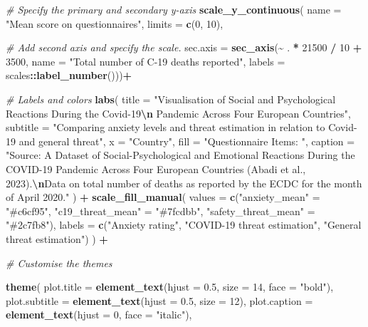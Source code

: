 \documentclass[
]{article}
\newenvironment{Shaded}{\begin{snugshade}}{\end{snugshade}}
\newcommand{\AttributeTok}[1]{\textcolor[rgb]{0.13,0.29,0.53}{#1}}
\newcommand{\CommentTok}[1]{\textcolor[rgb]{0.56,0.35,0.01}{\textit{#1}}}
\newcommand{\DecValTok}[1]{\textcolor[rgb]{0.00,0.00,0.81}{#1}}
\newcommand{\FloatTok}[1]{\textcolor[rgb]{0.00,0.00,0.81}{#1}}
\newcommand{\FunctionTok}[1]{\textcolor[rgb]{0.13,0.29,0.53}{\textbf{#1}}}
\newcommand{\NormalTok}[1]{#1}
\newcommand{\OtherTok}[1]{\textcolor[rgb]{0.56,0.35,0.01}{#1}}
\newcommand{\SpecialCharTok}[1]{\textcolor[rgb]{0.81,0.36,0.00}{\textbf{#1}}}
\newcommand{\StringTok}[1]{\textcolor[rgb]{0.31,0.60,0.02}{#1}}
\begin{document}
\begin{Shaded}
\begin{Highlighting}[]
  \CommentTok{\# Specify the primary and secondary y{-}axis}
    \FunctionTok{scale\_y\_continuous}\NormalTok{(}
    \AttributeTok{name =} \StringTok{"Mean score on questionnaires"}\NormalTok{,}
    \AttributeTok{limits =} \FunctionTok{c}\NormalTok{(}\DecValTok{0}\NormalTok{, }\DecValTok{10}\NormalTok{),}
    
  \CommentTok{\# Add second axis and specify the scale. }
    \AttributeTok{sec.axis =} \FunctionTok{sec\_axis}\NormalTok{(}\SpecialCharTok{\textasciitilde{}}\NormalTok{ . }\SpecialCharTok{*} \DecValTok{21500} \SpecialCharTok{/} \DecValTok{10} \SpecialCharTok{+} \DecValTok{3500}\NormalTok{, }
      \AttributeTok{name =} \StringTok{"Total number of C{-}19 deaths reported"}\NormalTok{,}
      \AttributeTok{labels =}\NormalTok{ scales}\SpecialCharTok{::}\FunctionTok{label\_number}\NormalTok{()))}\SpecialCharTok{+}
  
  \CommentTok{\# Labels and colors}
  \FunctionTok{labs}\NormalTok{(}
    \AttributeTok{title =} \StringTok{"Visualisation of Social and Psychological Reactions During the Covid{-}19}\SpecialCharTok{\textbackslash{}n}\StringTok{ Pandemic Across Four European Countries"}\NormalTok{,}
    \AttributeTok{subtitle =} \StringTok{"Comparing anxiety levels and threat estimation in relation to Covid{-}19 and general threat"}\NormalTok{,}
    \AttributeTok{x =} \StringTok{"Country"}\NormalTok{,}
    \AttributeTok{fill =} \StringTok{"Questionnaire Items:  "}\NormalTok{,}
    \AttributeTok{caption =} \StringTok{"Source: A Dataset of Social{-}Psychological and Emotional Reactions During the COVID{-}19 Pandemic Across Four European Countries (Abadi et al., 2023).}\SpecialCharTok{\textbackslash{}n}\StringTok{Data on total number of deaths as reported by the ECDC for the month of April 2020."}
\NormalTok{  ) }\SpecialCharTok{+}
  \FunctionTok{scale\_fill\_manual}\NormalTok{(}
    \AttributeTok{values =} \FunctionTok{c}\NormalTok{(}\StringTok{"anxiety\_mean"} \OtherTok{=} \StringTok{"\#c6cf95"}\NormalTok{, }\StringTok{"c19\_threat\_mean"} \OtherTok{=} \StringTok{"\#7fcdbb"}\NormalTok{, }\StringTok{"safety\_threat\_mean"} \OtherTok{=} \StringTok{"\#2c7fb8"}\NormalTok{),}
    \AttributeTok{labels =} \FunctionTok{c}\NormalTok{(}\StringTok{"Anxiety rating"}\NormalTok{, }\StringTok{"COVID{-}19 threat estimation"}\NormalTok{, }\StringTok{"General threat estimation"}\NormalTok{)}
\NormalTok{  ) }\SpecialCharTok{+}
  
  \CommentTok{\# Customise the themes}
  
  \FunctionTok{theme}\NormalTok{(}
    \AttributeTok{plot.title =} \FunctionTok{element\_text}\NormalTok{(}\AttributeTok{hjust =} \FloatTok{0.5}\NormalTok{, }\AttributeTok{size =} \DecValTok{14}\NormalTok{, }\AttributeTok{face =} \StringTok{"bold"}\NormalTok{),}
    \AttributeTok{plot.subtitle =} \FunctionTok{element\_text}\NormalTok{(}\AttributeTok{hjust =} \FloatTok{0.5}\NormalTok{, }\AttributeTok{size =} \DecValTok{12}\NormalTok{),}
    \AttributeTok{plot.caption =} \FunctionTok{element\_text}\NormalTok{(}\AttributeTok{hjust =} \DecValTok{0}\NormalTok{, }\AttributeTok{face =} \StringTok{"italic"}\NormalTok{), }
    

\end{Highlighting}
\end{Shaded}
\end{document}
